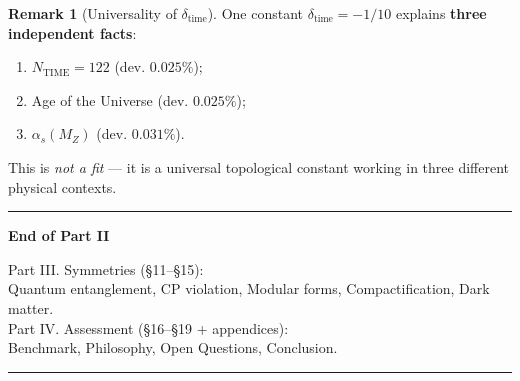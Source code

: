 \documentclass[11pt,a4paper]{article}
\theoremstyle{definition}
\newtheorem{remark}[theorem]{Remark}
\begin{document}
\begin{remark}[Universality of $\delta_{\text{time}}$]
\label{rem:delta-time-universal-review}
One constant $\delta_{\text{time}} = -1/10$ explains 
\textbf{three independent facts}:
\begin{enumerate}
    \item $N_{\text{TIME}} = 122$ (dev. $0.025\%$);
    \item Age of the Universe (dev. $0.025\%$);
    \item $\alpha_s(M_Z)$ (dev. $0.031\%$).
\end{enumerate}
This is \emph{not a fit} — it is a universal topological 
constant working in three different physical contexts.
\end{remark}


\vfill

\begin{center}
\rule{0.6\textwidth}{0.4pt}

\vspace{0.5cm}

{\large\bfseries End of Part II}

\vspace{0.3cm}

{\small
Part III. Symmetries (§11–§15): \\
Quantum entanglement, CP violation, Modular forms, 
Compactification, Dark matter. \\
Part IV. Assessment (§16–§19 + appendices): \\
Benchmark, Philosophy, Open Questions, Conclusion.
}

\vspace{0.5cm}

\rule{0.6\textwidth}{0.4pt}
\end{center}


\end{document}
